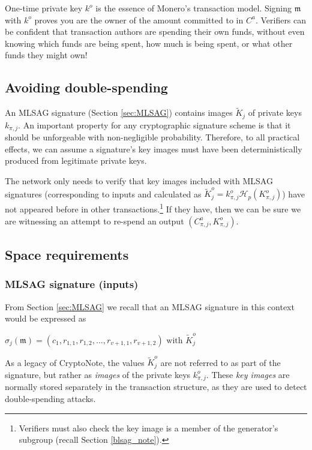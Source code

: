 One-time private key $k^o$ is the essence of Monero's transaction model. Signing $\mathfrak{m}$ with $k^o$ proves you are the owner of the amount committed to in $C^a$. Verifiers can be confident that transaction authors are spending their own funds, without even knowing which funds are being spent, how much is being spent, or what other funds they might own!


\subsection{Avoiding double-spending}

An MLSAG signature (Section \ref{sec:MLSAG}) contains images \(\tilde{K}_{j}\) of private keys \(k_{\pi, j}\). An important property for any cryptographic signature scheme is that it should be unforgeable with non-negligible probability. Therefore, to all practical effects, we can assume a signature’s key images must have been deterministically produced from legitimate private keys.

The network only needs to verify that key images included with MLSAG signatures (corresponding to inputs and calculated as $\tilde{K}^o_{j} = k^o_{\pi,j} \mathcal{H}_p(K^o_{\pi,j})$) have not appeared before in other transactions.\footnote{Verifiers must also check the key image is a member of the generator's subgroup (recall Section \ref{blsag_note}).} If they have, then we can be sure we are witnessing an attempt to re-spend an output $(C^a_{\pi,j}, K_{\pi,j}^o)$.


\subsection{Space requirements}
\label{subsec:space-and-ver-rcttypefull}

\subsubsection*{MLSAG signature (inputs)}

From Section \ref{sec:MLSAG} we recall that an MLSAG signature in this context would be expressed as

\hfill \(\sigma_j(\mathfrak{m}) = (c_1, r_{1, 1}, r_{1, 2}, ..., r_{v+1, 1}, r_{v+1, 2}) \textrm{ with } \tilde{K}^o_j \) \hfill \phantom{.}

As a legacy of CryptoNote, the values \(\tilde{K}^o_j\) are not referred to as part of the signature, but rather as {\em images} of the private keys $k^o_{\pi,j}$. These {\em key images} are normally stored separately in the transaction structure, as they are used to detect double-spending attacks.


